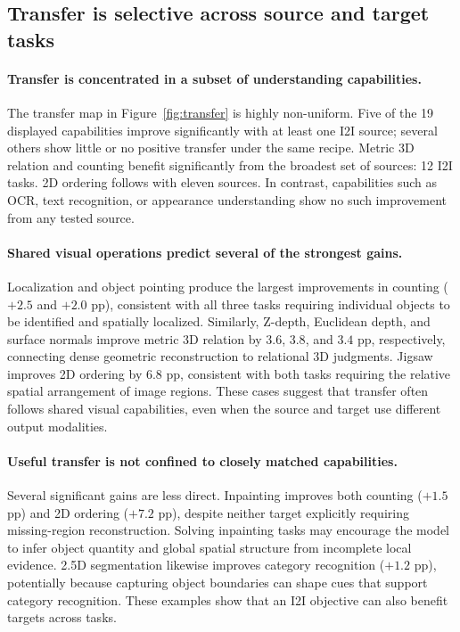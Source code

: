 \subsection{Transfer is selective across source and target tasks}
\paragraph{Transfer is concentrated in a subset of understanding capabilities.}
The transfer map in Figure~\ref{fig:transfer} is highly non-uniform.
Five of the 19 displayed capabilities improve significantly with at least one I2I source; several others show little or no positive transfer under the same recipe.
Metric 3D relation and counting benefit significantly from the broadest set of sources: 12 I2I tasks.
2D ordering follows with eleven sources.
In contrast, capabilities such as OCR, text recognition, or appearance understanding show no such improvement from any tested source.
\paragraph{Shared visual operations predict several of the strongest gains.}
Localization and object pointing produce the largest improvements in counting ($+2.5$ and $+2.0$ pp), consistent with all three tasks requiring individual objects to be identified and spatially localized.
Similarly, Z-depth, Euclidean depth, and surface normals improve metric 3D relation by $3.6$, $3.8$, and $3.4$ pp, respectively, connecting dense geometric reconstruction to relational 3D judgments.
Jigsaw improves 2D ordering by $6.8$ pp, consistent with both tasks requiring the relative spatial arrangement of image regions.
These cases suggest that transfer often follows shared visual capabilities, even when the source and target use different output modalities.
\paragraph{Useful transfer is not confined to closely matched capabilities.}
Several significant gains are less direct.
Inpainting improves both counting ($+1.5$ pp) and 2D ordering ($+7.2$ pp), despite neither target explicitly requiring missing-region reconstruction.
Solving inpainting tasks may encourage the model to infer object quantity and global spatial structure from incomplete local evidence.
2.5D segmentation likewise improves category recognition ($+1.2$ pp), potentially because capturing object boundaries can shape cues that support category recognition.
These examples show that an I2I objective can also benefit targets across tasks.

